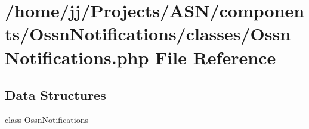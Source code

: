 \hypertarget{classes_2_ossn_notifications_8php}{}\section{/home/jj/\+Projects/\+A\+S\+N/components/\+Ossn\+Notifications/classes/\+Ossn\+Notifications.php File Reference}
\label{classes_2_ossn_notifications_8php}
\subsection*{Data Structures}
\begin{DoxyCompactItemize}
\item 
class \hyperlink{class_ossn_notifications}{Ossn\+Notifications}
\end{DoxyCompactItemize}
